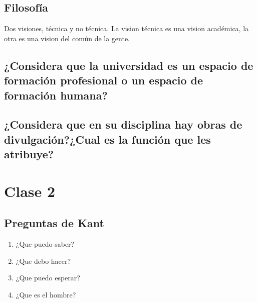 \documentclass[11pt]{book}
\begin{document}
    \section{Filosofía}
    Dos visiones, técnica y no técnica. La vision técnica es una vision académica, la otra es una vision del común de la gente.\\
    \section{¿Considera que la universidad es un espacio de formación profesional o un espacio de formación humana?}
    \section{¿Considera que en su disciplina hay obras de divulgación?¿Cual es la función que les atribuye?}

    \chapter{Clase 2}
    \section{Preguntas de Kant}
    \begin{enumerate}
        \item ¿Que puedo saber?

        \item ¿Que debo hacer?

        \item ¿Que puedo esperar?

        \item ¿Que es el hombre?
    \end{enumerate}
\end{document}
